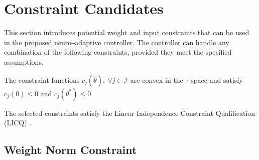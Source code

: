 \documentclass[lettersize,journal]{IEEEtran}
\begin{document}
 \section{Constraint Candidates}\label{sec:cstr candidates} 

This section introduces potential weight and input constraints that can be used in the proposed neuro‒adaptive controller. The controller can handle any combination of the following constraints, provided they meet the specified assumptions.

\begin{assum}
    The constraint functions $c_j(\hat\theta),\ \forall j\in\mathcal I$ are convex in the $\tau$-space and satisfy $c_j(0) \le 0$ and $c_j(\theta^*)\le 0$.
    \label{assum1}
\end{assum}



\begin{assum}
    The selected constraints satisfy the Linear Independence Constraint Qualification (LICQ) \cite[Chap.~12 Def.~12.1]{RN22}.
    \label{assum2}
\end{assum}

\subsection{Weight Norm Constraint}\label{sec:cstr weight ball}
\end{document}
